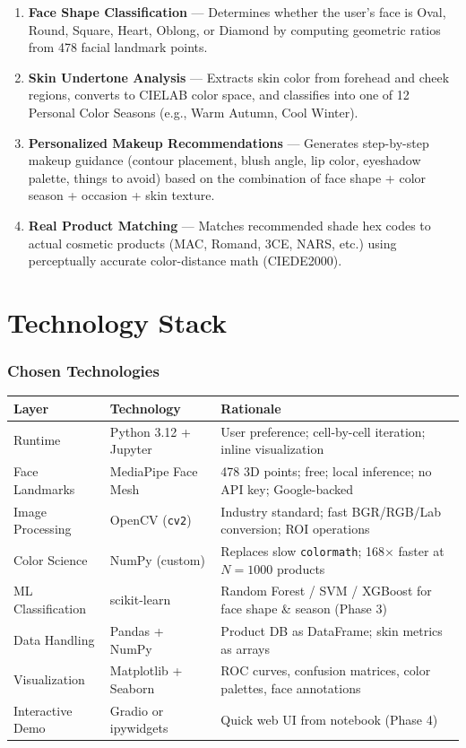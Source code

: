 \documentclass[12pt,a4paper]{article}
\begin{document}
\begin{enumerate}[label=\arabic*.]
    \item \textbf{Face Shape Classification} --- Determines whether the user's face is Oval, Round, Square, Heart, Oblong, or Diamond by computing geometric ratios from 478 facial landmark points.
    \item \textbf{Skin Undertone Analysis} --- Extracts skin color from forehead and cheek regions, converts to CIELAB color space, and classifies into one of 12 Personal Color Seasons (e.g., Warm Autumn, Cool Winter).
    \item \textbf{Personalized Makeup Recommendations} --- Generates step-by-step makeup guidance (contour placement, blush angle, lip color, eyeshadow palette, things to avoid) based on the combination of face shape + color season + occasion + skin texture.
    \item \textbf{Real Product Matching} --- Matches recommended shade hex codes to actual cosmetic products (MAC, Romand, 3CE, NARS, etc.) using perceptually accurate color-distance math (CIEDE2000).
\end{enumerate}



\part{Technology Stack}

\section{Chosen Technologies}

\begin{longtable}{@{}l l p{8cm}@{}}
\toprule
\textbf{Layer} & \textbf{Technology} & \textbf{Rationale} \\
\midrule
\endhead
Runtime & Python 3.12 + Jupyter & User preference; cell-by-cell iteration; inline visualization \\
Face Landmarks & MediaPipe Face Mesh & 478 3D points; free; local inference; no API key; Google-backed \\
Image Processing & OpenCV (\texttt{cv2}) & Industry standard; fast BGR/RGB/Lab conversion; ROI operations \\
Color Science & NumPy (custom) & Replaces slow \texttt{colormath}; 168$\times$ faster at $N{=}1000$ products \\
ML Classification & scikit-learn & Random Forest / SVM / XGBoost for face shape \& season (Phase 3) \\
Data Handling & Pandas + NumPy & Product DB as DataFrame; skin metrics as arrays \\
Visualization & Matplotlib + Seaborn & ROC curves, confusion matrices, color palettes, face annotations \\
Interactive Demo & Gradio or ipywidgets & Quick web UI from notebook (Phase 4) \\
\bottomrule
\end{longtable}
\end{document}
